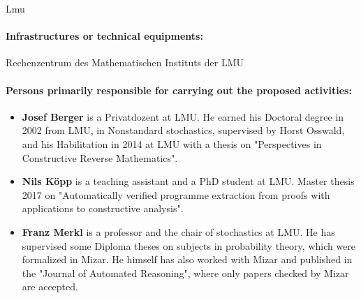 \begin{sitedescription}{Lmu}

\paragraph{Infrastructures or technical equipments:}

Rechenzentrum des Mathematischen Instituts der LMU 

\paragraph{Persons primarily responsible for carrying out the proposed activities:}

\begin{itemize}

\item \textbf{Josef Berger} is a Privatdozent at LMU.  He earned his
  Doctoral degree in 2002 from LMU, in Nonstandard stochastics,
  supervised by Horst Osswald, and his Habilitation in 2014 at LMU
  with a thesis on "Perspectives in Constructive Reverse Mathematics".

\item \textbf{Nils K\"opp} is a teaching assistant and a PhD student
  at LMU.  Master thesis 2017 on "Automatically verified programme
  extraction from proofs with applications to constructive analysis".

\item \textbf{Franz Merkl} is a professor and the chair of stochastics
  at LMU.  He has supervised some Diploma theses on subjects in
  probability theory, which were formalized in Mizar.  He himself has
  also worked with Mizar and published in the "Journal of Automated
  Reasoning", where only papers checked by Mizar are accepted.


\end{itemize}
\end{sitedescription}
